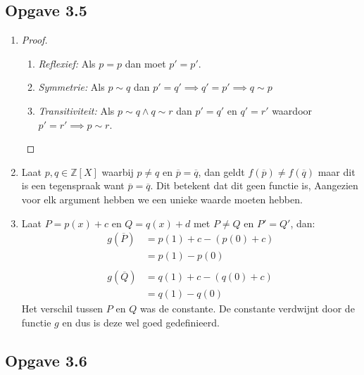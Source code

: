 \documentclass{article}
\newcommand{\Z}{\mathbb{Z}}
\newcommand{\ol}[1]{\overline{#1}}
\begin{document}
\subsection*{Opgave 3.5}
\begin{enumerate}[label=\alph*)]
	\item
	      \begin{proof}
		      \begin{enumerate}[label=\arabic*]
			      \item \emph{Reflexief:} Als $p = p$ dan moet $p' = p'$.
			      \item \emph{Symmetrie:} Als $p \sim q$ dan $p' = q'
				            \implies q' = p' \implies q \sim p$
			      \item \emph{Transitiviteit:} Als $p \sim q \wedge q \sim r$
			            dan $p' = q'$ en $q' = r'$ waardoor $p' = r' \implies p \sim r$.
		      \end{enumerate}
	      \end{proof}
	\item
	      Laat $p, q \in \Z[X]$ waarbij $p \neq q$ en $\ol{p} = \ol{q}$,
	      dan geldt $f(\ol{p}) \neq f(\ol{q})$
	      maar dit is een tegenspraak want $\ol{p} = \ol{q}$.
	      Dit betekent dat dit geen functie is, Aangezien
	      voor elk argument hebben we een unieke waarde moeten hebben.
	\item
	      Laat $P = p(x) + c$ en $Q = q(x) + d$ met
	      $P \neq Q$ en $P' = Q'$, dan:
	      \begin{align*}
		      g(\ol{P}) & = p(1) + c - (p(0) + c) \\
		                & = p(1) - p(0)           \\ \\
		      g(\ol{Q}) & = q(1) + c - (q(0) + c) \\
		                & = q(1) - q(0)
	      \end{align*}
	      Het verschil tussen $P$ en $Q$ was de constante.
	      De constante verdwijnt door de functie $g$ en dus is
	      deze wel goed gedefinieerd.
\end{enumerate}
\subsection*{Opgave 3.6}
\end{document}
